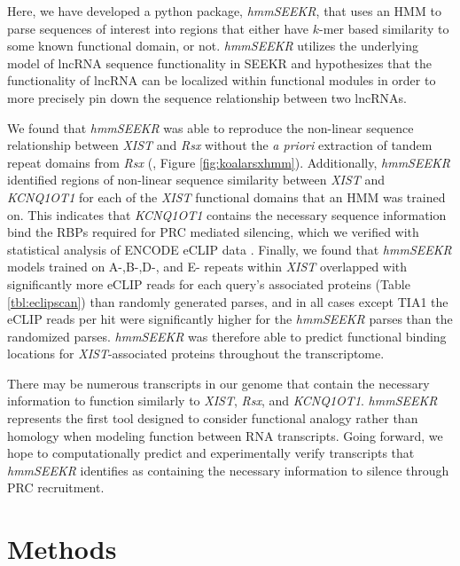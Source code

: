 Here, we have developed a python package, \emph{hmmSEEKR}, that uses an HMM to parse sequences of interest into regions that either have $k$-mer based similarity to some known functional domain, or not. \emph{hmmSEEKR} utilizes the underlying model of lncRNA sequence functionality in SEEKR \cite{Kirk2018FunctionalContent} and hypothesizes that the functionality of lncRNA can be localized within functional modules \cite{Pang2006RapidFunction, Nesterova2001CharacterizationSequence,Hezroni2015PrinciplesSpecies,Brockdorff2018LocalNcRNA,Sprague2019NonlinearDomains} in order to more precisely pin down the sequence relationship between two lncRNAs. 

We found that \emph{hmmSEEKR} was able to reproduce the non-linear sequence relationship between \emph{XIST} and \emph{Rsx} without the \emph{a priori} extraction of tandem repeat domains from \emph{Rsx} (\cite{Sprague2019NonlinearDomains}, Figure \ref{fig:koalarsxhmm}). Additionally, \emph{hmmSEEKR} identified regions of non-linear sequence similarity between \emph{XIST} and \emph{KCNQ1OT1} for each of the \emph{XIST} functional domains that an HMM was trained on. This indicates that \emph{KCNQ1OT1} contains the necessary sequence information bind the RBPs required for PRC mediated silencing, which we verified with statistical analysis of ENCODE eCLIP data \cite{VanNostrand2016RobusteCLIP}. Finally, we found that \emph{hmmSEEKR} models trained on A-,B-,D-, and E- repeats within \emph{XIST} overlapped with significantly more eCLIP reads for each query's associated proteins (Table \ref{tbl:eclipscan}) than randomly generated parses, and in all cases except TIA1 the eCLIP reads per hit were significantly higher for the \emph{hmmSEEKR} parses than the randomized parses. \emph{hmmSEEKR} was therefore able to predict functional binding locations for \emph{XIST}-associated proteins throughout the transcriptome. 

There may be numerous transcripts in our genome that contain the necessary information to function similarly to \textit{XIST}, \textit{Rsx}, and \textit{KCNQ1OT1}. \textit{hmmSEEKR} represents the first tool designed to consider functional analogy rather than homology when modeling function between RNA transcripts. Going forward, we hope to computationally predict and experimentally verify transcripts that \textit{hmmSEEKR} identifies as containing the necessary information to silence through PRC recruitment. 




\section{Methods}

